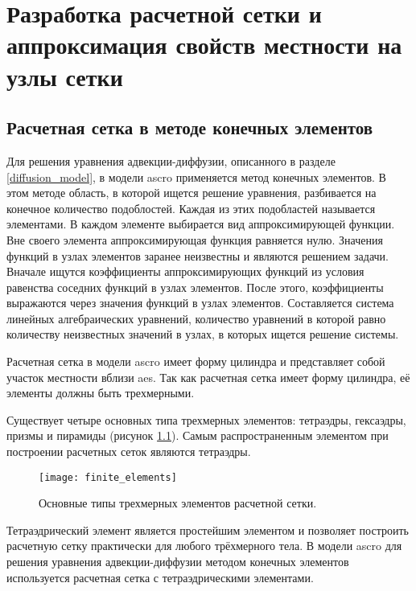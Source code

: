 \chapter{Разработка расчетной сетки и аппроксимация свойств местности на узлы сетки}


\section{Расчетная сетка в методе конечных элементов}

Для решения уравнения адвекции-диффузии, описанного в разделе \ref{diffusion_model}, в модели \ac{ascro} применяется 
метод конечных элементов. В этом методе область, в которой ищется решение уравнения, разбивается на конечное количество 
подоблостей. Каждая из этих подобластей называется элементами. В каждом элементе выбирается вид аппроксимирующей функции. 
Вне своего элемента аппроксимирующая функция равняется нулю. Значения функций в узлах элементов заранее неизвестны и 
являются решением задачи. Вначале ищутся коэффициенты аппроксимирующих функций из условия равенства соседних функций в 
узлах элементов. После этого, коэффициенты выражаются через значения функций в узлах элементов. Составляется система 
линейных алгебраических уравнений, количество уравнений в которой равно количеству неизвестных значений в узлах, в 
которых ищется решение системы. 

Расчетная сетка в модели \ac{ascro} имеет форму цилиндра и представляет собой участок местности вблизи \ac{aes}. 
Так как расчетная сетка имеет форму цилиндра, её элементы должны быть трехмерными.

Существует четыре основных типа трехмерных элементов: тетраэдры, гексаэдры, призмы и пирамиды (рисунок 
\ref{fig_finite_elements}). Самым распространенным элементом при построении расчетных сеток являются тетраэдры. 

\begin{figure}[ht]
\centering
	\texttt{[image: finite\_elements]}
	\captionsetup{justification=centering}
    \caption{Основные типы трехмерных элементов расчетной сетки.}
    \label{fig_finite_elements}
\end{figure}

Тетраэдрический элемент является простейшим элементом и позволяет построить расчетную сетку практически для любого 
трёхмерного тела. В модели \ac{ascro} для решения уравнения адвекции-диффузии методом конечных элементов используется 
расчетная сетка с тетраэдрическими элементами.

